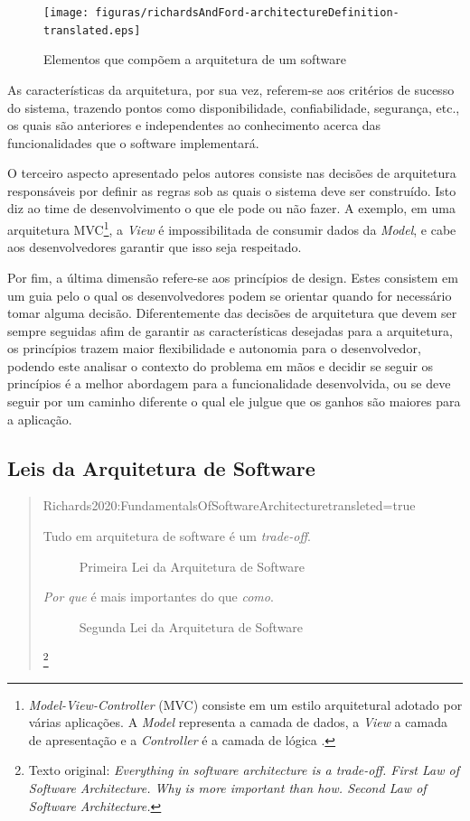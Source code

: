 \begin{figure}[h]
  \centering
  \texttt{[image: figuras/richardsAndFord-architectureDefinition-translated.eps]}
  \caption{Elementos que compõem a arquitetura de um software\label{fig:ArchitectureDefinition}
    }
\end{figure}

As características da arquitetura, por sua vez, referem-se aos critérios de sucesso do sistema,
trazendo pontos como disponibilidade, confiabilidade, segurança, etc., os quais são anteriores e
independentes ao conhecimento acerca das funcionalidades que o software implementará.

O terceiro aspecto apresentado pelos autores consiste nas decisões de arquitetura responsáveis por definir
as regras sob as quais o sistema deve ser construído. Isto diz ao time de desenvolvimento o que ele
pode ou não fazer. A exemplo, em uma arquitetura \gls{MVC}\footnote{\textit{Model-View-Controller} (MVC)
consiste em um estilo arquitetural adotado por várias aplicações. A \textit{Model} representa a
camada de dados, a \textit{View} a camada de apresentação e a \textit{Controller} é a camada de
lógica \cite{mcgovern2004practical}.}, a \textit{View} é
impossibilitada de consumir dados da \textit{Model}, e cabe aos desenvolvedores garantir que isso
seja respeitado.

Por fim, a última dimensão refere-se aos princípios de design. Estes consistem em um guia pelo o qual
os desenvolvedores podem se orientar quando for necessário tomar alguma decisão. Diferentemente das
decisões de arquitetura que devem ser sempre seguidas afim de  garantir as características desejadas
para a arquitetura, os princípios trazem maior flexibilidade e autonomia para o desenvolvedor, podendo
este analisar o contexto do problema em mãos e decidir se seguir os princípios é a melhor abordagem
para a funcionalidade desenvolvida, ou se deve seguir por um caminho diferente o qual ele julgue que
os ganhos são maiores para a aplicação.

\subsection{Leis da Arquitetura de Software}
\label{leis}

\begin{quotation}{Richards2020:FundamentalsOfSoftwareArchitecture}{transleted=true}
  \begin{description}
    \item [Tudo em arquitetura de software é um \textit{trade-off}.] Primeira Lei da Arquitetura de
        Software
    \item [\textit{Por que} é mais importantes do que \textit{como}.] Segunda Lei da Arquitetura de Software
  \end{description}\footnote{Texto original: \textit{Everything in software architecture is a trade-off. First Law
    of Software Architecture. Why is more important than how. Second Law of Software Architecture.}}
\end{quotation}

